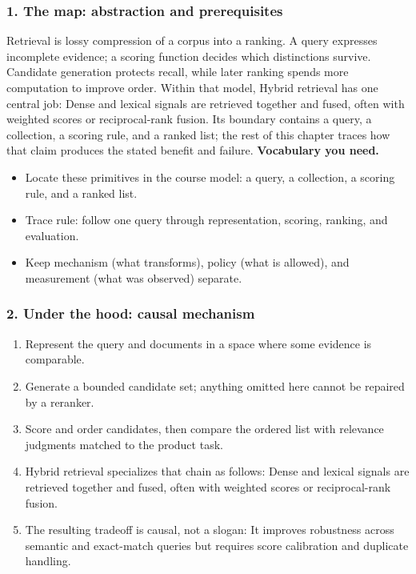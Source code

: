 \subsubsection*{1. The map: abstraction and prerequisites}
Retrieval is lossy compression of a corpus into a ranking. A query expresses incomplete evidence; a scoring function decides which distinctions survive. Candidate generation protects recall, while later ranking spends more computation to improve order.
Within that model, Hybrid retrieval has one central job: Dense and lexical signals are retrieved together and fused, often with weighted scores or reciprocal-rank fusion. Its boundary contains a query, a collection, a scoring rule, and a ranked list; the rest of this chapter traces how that claim produces the stated benefit and failure.
\textbf{Vocabulary you need.}\begin{itemize}
\item Locate these primitives in the course model: a query, a collection, a scoring rule, and a ranked list.
\item Trace rule: follow one query through representation, scoring, ranking, and evaluation.
\item Keep mechanism (what transforms), policy (what is allowed), and measurement (what was observed) separate.
\end{itemize}
\subsubsection*{2. Under the hood: causal mechanism}\begin{enumerate}
\item Represent the query and documents in a space where some evidence is comparable.
\item Generate a bounded candidate set; anything omitted here cannot be repaired by a reranker.
\item Score and order candidates, then compare the ordered list with relevance judgments matched to the product task.
\item Hybrid retrieval specializes that chain as follows: Dense and lexical signals are retrieved together and fused, often with weighted scores or reciprocal-rank fusion.
\item The resulting tradeoff is causal, not a slogan: It improves robustness across semantic and exact-match queries but requires score calibration and duplicate handling.
\end{enumerate}
